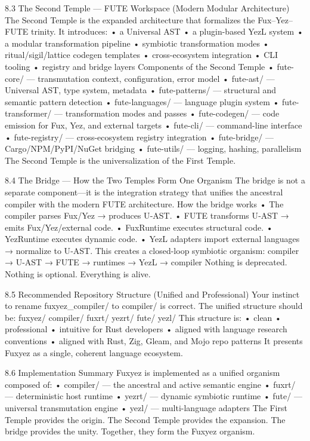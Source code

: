 8.3 The Second Temple — FUTE Workspace (Modern Modular Architecture)
The Second Temple is the expanded architecture that formalizes the Fux–Yez–FUTE trinity. It introduces:
• 	a Universal AST
• 	a plugin-based YezL system
• 	a modular transformation pipeline
• 	symbiotic transformation modes
• 	ritual/sigil/lattice codegen templates
• 	cross-ecosystem integration
• 	CLI tooling
• 	registry and bridge layers
Components of the Second Temple
• 	fute-core/ — transmutation context, configuration, error model
• 	fute-ast/ — Universal AST, type system, metadata
• 	fute-patterns/ — structural and semantic pattern detection
• 	fute-languages/ — language plugin system
• 	fute-transformer/ — transformation modes and passes
• 	fute-codegen/ — code emission for Fux, Yez, and external targets
• 	fute-cli/ — command-line interface
• 	fute-registry/ — cross-ecosystem registry integration
• 	fute-bridge/ — Cargo/NPM/PyPI/NuGet bridging
• 	fute-utils/ — logging, hashing, parallelism
The Second Temple is the universalization of the First Temple.

8.4 The Bridge — How the Two Temples Form One Organism
The bridge is not a separate component—it is the integration strategy that unifies the ancestral compiler with the modern FUTE architecture.
How the bridge works
• 	The compiler parses Fux/Yez → produces U‑AST.
• 	FUTE transforms U‑AST → emits Fux/Yez/external code.
• 	FuxRuntime executes structural code.
• 	YezRuntime executes dynamic code.
• 	YezL adapters import external languages → normalize to U‑AST.
This creates a closed-loop symbiotic organism:
compiler → U-AST → FUTE → runtimes → YezL → compiler
Nothing is deprecated.
Nothing is optional.
Everything is alive.

8.5 Recommended Repository Structure (Unified and Professional)
Your instinct to rename fuxyez_compiler/ to compiler/ is correct.
The unified structure should be:
fuxyez/
    compiler/
    fuxrt/
    yezrt/
    fute/
    yezl/
This structure is:
• 	clean
• 	professional
• 	intuitive for Rust developers
• 	aligned with language research conventions
• 	aligned with Rust, Zig, Gleam, and Mojo repo patterns
It presents Fuxyez as a single, coherent language ecosystem.

8.6 Implementation Summary
Fuxyez is implemented as a unified organism composed of:
• 	compiler/ — the ancestral and active semantic engine
• 	fuxrt/ — deterministic host runtime
• 	yezrt/ — dynamic symbiotic runtime
• 	fute/ — universal transmutation engine
• 	yezl/ — multi-language adapters
The First Temple provides the origin.
The Second Temple provides the expansion.
The bridge provides the unity.
Together, they form the Fuxyez organism.

